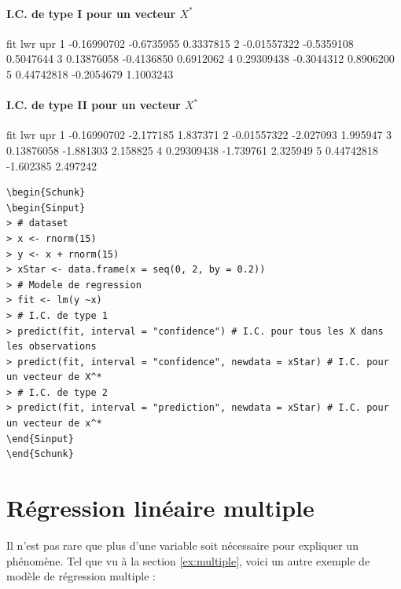 \documentclass[11pt,french]{report}
\begin{document}
\subsubsection*{I.C. de type I pour un vecteur $X^*$}
\begin{Schunk}
\begin{Soutput}
          fit        lwr       upr
1 -0.16990702 -0.6735955 0.3337815
2 -0.01557322 -0.5359108 0.5047644
3  0.13876058 -0.4136850 0.6912062
4  0.29309438 -0.3044312 0.8906200
5  0.44742818 -0.2054679 1.1003243
\end{Soutput}
\end{Schunk}

\subsubsection*{I.C. de type II pour un vecteur $X^*$}
\begin{Schunk}
\begin{Soutput}
          fit       lwr      upr
1 -0.16990702 -2.177185 1.837371
2 -0.01557322 -2.027093 1.995947
3  0.13876058 -1.881303 2.158825
4  0.29309438 -1.739761 2.325949
5  0.44742818 -1.602385 2.497242
\end{Soutput}
\end{Schunk}

\begin{lstlisting}[linerange=\\begin\{Sinput\}-\\end\{Sinput\},includerangemarker=false, caption = Code source en R pour l'exemple]
\begin{Schunk}
\begin{Sinput}
> # dataset
> x <- rnorm(15)
> y <- x + rnorm(15)
> xStar <- data.frame(x = seq(0, 2, by = 0.2)) 
> # Modele de regression
> fit <- lm(y ~x)
> # I.C. de type 1
> predict(fit, interval = "confidence") # I.C. pour tous les X dans les observations
> predict(fit, interval = "confidence", newdata = xStar) # I.C. pour un vecteur de X^*
> # I.C. de type 2
> predict(fit, interval = "prediction", newdata = xStar) # I.C. pour un vecteur de x^*
\end{Sinput}
\end{Schunk}
\end{lstlisting}
\bigskip

\chapter{Régression linéaire multiple}
Il n'est pas rare que plus d'une variable soit nécessaire pour expliquer un phénomène. 
Tel que vu à la section \ref{ex:multiple}, voici un autre exemple de modèle de régression multiple :
\end{document}
